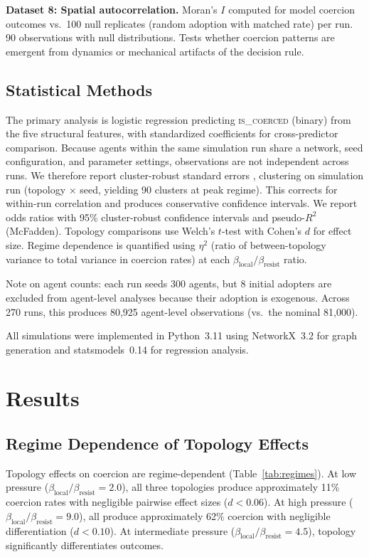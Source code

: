 \documentclass[11pt, a4paper]{article}
\newcommand{\betalocal}{\beta_{\text{local}}}
\newcommand{\betaresist}{\beta_{\text{resist}}}
\begin{document}
\textbf{Dataset 8: Spatial autocorrelation.} Moran's $I$ computed for model coercion outcomes vs.\ 100 null replicates (random adoption with matched rate) per run. 90 observations with null distributions. Tests whether coercion patterns are emergent from dynamics or mechanical artifacts of the decision rule.

\subsection{Statistical Methods}

The primary analysis is logistic regression predicting \textsc{is\_coerced} (binary) from the five structural features, with standardized coefficients for cross-predictor comparison. Because agents within the same simulation run share a network, seed configuration, and parameter settings, observations are not independent across runs. We therefore report cluster-robust standard errors \citep{cameron2008bootstrap}, clustering on simulation run (topology $\times$ seed, yielding 90 clusters at peak regime). This corrects for within-run correlation and produces conservative confidence intervals. We report odds ratios with 95\% cluster-robust confidence intervals and pseudo-$R^2$ (McFadden). Topology comparisons use Welch's $t$-test with Cohen's $d$ for effect size. Regime dependence is quantified using $\eta^2$ (ratio of between-topology variance to total variance in coercion rates) at each $\betalocal/\betaresist$ ratio.

Note on agent counts: each run seeds 300 agents, but 8 initial adopters are excluded from agent-level analyses because their adoption is exogenous. Across 270 runs, this produces 80{,}925 agent-level observations (vs.\ the nominal 81{,}000).

All simulations were implemented in Python~3.11 using NetworkX~3.2 for graph generation and statsmodels~0.14 for regression analysis.

\section{Results}
\label{sec:results}

\subsection{Regime Dependence of Topology Effects}

Topology effects on coercion are regime-dependent (Table~\ref{tab:regimes}). At low pressure ($\betalocal/\betaresist = 2.0$), all three topologies produce approximately 11\% coercion rates with negligible pairwise effect sizes ($d < 0.06$). At high pressure ($\betalocal/\betaresist = 9.0$), all produce approximately 62\% coercion with negligible differentiation ($d < 0.10$). At intermediate pressure ($\betalocal/\betaresist = 4.5$), topology significantly differentiates outcomes.
\end{document}
